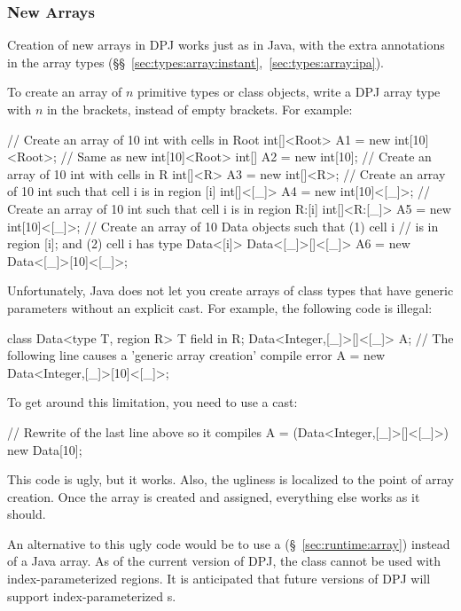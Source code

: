 \subsubsection{New Arrays%
\label{sec:types:array:new}}

Creation of new arrays in DPJ works just as in Java, with the extra
annotations in the array types
(\S\S~\ref{sec:types:array:instant},~\ref{sec:types:array:ipa}).  

 To create an array of
$n$ primitive types or class objects, write a DPJ array type with $n$
in the brackets, instead of empty brackets.  For example:
%
\begin{dpjlisting}
// Create an array of 10 int with cells in Root
int[]<Root> A1 = new int[10]<Root>;
// Same as new int[10]<Root>
int[] A2 = new int[10];
// Create an array of 10 int with cells in R
int[]<R> A3 = new int[]<R>;
// Create an array of 10 int such that cell i is in region [i]
int[]<[_]> A4 = new int[10]<[_]>;
// Create an array of 10 int such that cell i is in region R:[i]
int[]<R:[_]> A5 = new int[10]<[_]>;
// Create an array of 10 Data objects such that (1) cell i
// is in region [i]; and (2) cell i has type Data<[i]>
Data<[_]>[]<[_]> A6 = new Data<[_]>[10]<[_]>;
\end{dpjlisting}

Unfortunately, Java does not let you create arrays of class types that
have generic parameters without an explicit cast.  For example, the
following code is illegal:
%
\begin{dpjlisting}
class Data<type T, region R> {
    T field in R;
}
Data<Integer,[_]>[]<[_]> A;
// The following line causes a 'generic array creation' compile error
A = new Data<Integer,[_]>[10]<[_]>;
\end{dpjlisting}
%
To get around this limitation, you need to use a cast:
%
\begin{dpjlisting}
// Rewrite of the last line above so it compiles
A = (Data<Integer,[_]>[]<[_]>) new Data[10];
\end{dpjlisting}
%
This code is ugly, but it works.  Also, the ugliness is localized to
the point of array creation.  Once the array is created and assigned,
everything else works as it should.

An alternative to this ugly code would be to use a 
(\S~\ref{sec:runtime:array}) instead of a Java array.  As of the
current version of DPJ, the  class cannot be used with
index-parameterized regions.  It is anticipated that future versions
of DPJ will support index-parameterized s.


